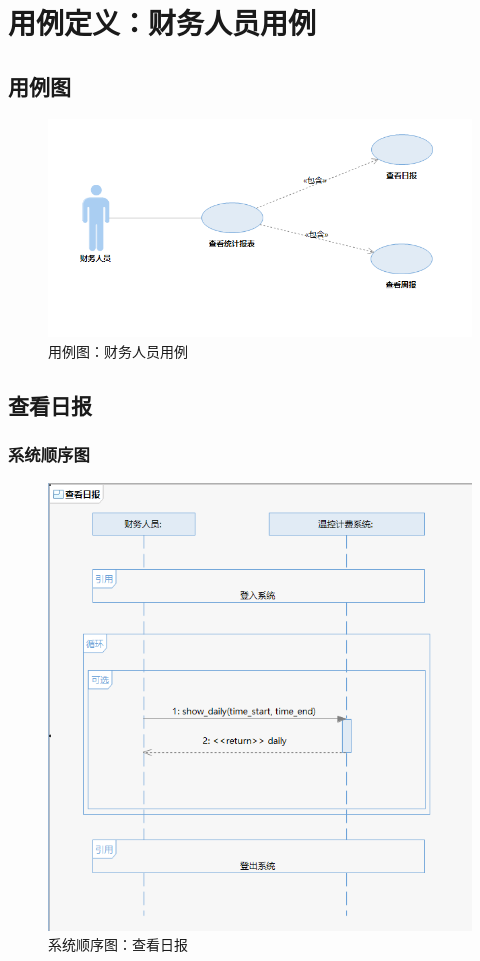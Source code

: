 \documentclass[black,normal,cn]{elegantnote}
\begin{document}
\section{用例定义：财务人员用例}

\subsection{用例图}

\begin{figure}[H]
    \centering
    \includegraphics[width=.8\textwidth]{fig/276011.png}
    \caption{用例图：财务人员用例}
    \label{fig:276011}
\end{figure}

\subsection{查看日报}

\subsubsection{系统顺序图}
\begin{figure}[H]
    \centering
    \includegraphics[width=.8\textwidth]{fig/276012.png}
    \caption{系统顺序图：查看日报}
    \label{fig:276002}
\end{figure}
\end{document}
